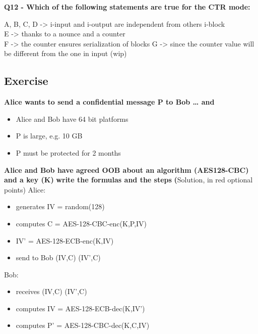 \textbf{Q12 - Which of the following statements are true for the CTR mode:}
\textcolor{Comment}{
    A, B, C, D -> i-input and i-output are independent from others i-block\\
    E -> thanks to a nounce and a counter\\
    F -> the counter ensures serialization of blocks
    G -> since the counter value will be different from the one in input (wip)
}

\subsection*{Exercise}
\textbf{Alice wants to send a confidential message P to Bob … and}
\begin{itemize}
    \item Alice and Bob have 64 bit platforms
    \item P is large, e.g. 10 GB
    \item P must be protected for 2 months    
\end{itemize}    

\textbf{Alice and Bob have agreed OOB about an algorithm (AES128-CBC) and a key (K)}
\textbf{write the formulas and the steps}
\textbf(Solution, in red optional points)
Alice: 
\begin{itemize}
    \item generates IV = random(128)
    \item computes C = AES-128-CBC-enc(K,P,IV)
    \item \textcolor{Comment}{IV' = AES-128-ECB-enc(K,IV)}
    \item send to Bob (IV,C) \textcolor{Comment}{(IV',C)}
\end{itemize}
Bob: 
\begin{itemize}
    \item receives (IV,C) \textcolor{Comment}{(IV',C)}
    \item \textcolor{Comment}{computes IV = AES-128-ECB-dec(K,IV')} 
    \item computes P' = AES-128-CBC-dec(K,C,IV)
\end{itemize}


